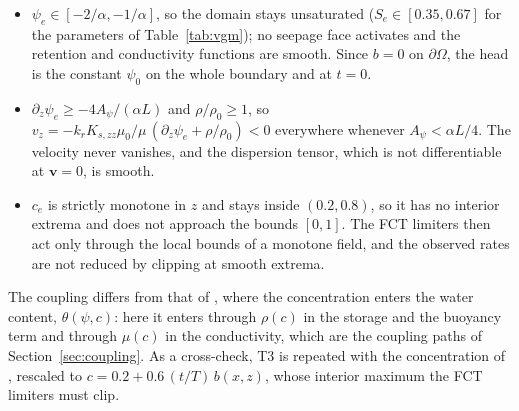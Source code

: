 \begin{itemize}
  \item $\psi_e\in[-2/\alpha,-1/\alpha]$, so the domain stays unsaturated
    ($S_e\in[0.35,0.67]$ for the parameters of Table~\ref{tab:vgm}); no
    seepage face activates and the retention and conductivity functions are
    smooth. Since $b=0$ on $\partial\Omega$, the head is the constant
    $\psi_0$ on the whole boundary and at $t=0$.
  \item $\partial_z\psi_e\ge-4A_\psi/(\alpha L)$ and $\rho/\rho_0\ge1$, so
    $v_z=-k_r K_{s,zz}\mu_0/\mu\,(\partial_z\psi_e+\rho/\rho_0)<0$ everywhere
    whenever $A_\psi<\alpha L/4$. The velocity never vanishes, and the
    dispersion tensor, which is not differentiable at $\mathbf{v}=0$, is
    smooth.
  \item $c_e$ is strictly monotone in $z$ and stays inside $(0.2,0.8)$, so it
    has no interior extrema and does not approach the bounds $[0,1]$. The FCT
    limiters then act only through the local bounds of a monotone field, and
    the observed rates are not reduced by clipping at smooth extrema.
\end{itemize}
The coupling differs from that of \cite{suciu2021}, where the concentration
enters the water content, $\theta(\psi,c)$: here it enters through
$\rho(c)$ in the storage and the buoyancy term and through $\mu(c)$ in the
conductivity, which are the coupling paths of Section~\ref{sec:coupling}. As a
cross-check, T3 is repeated with the concentration of \cite{suciu2021},
rescaled to $c=0.2+0.6\,(t/T)\,b(x,z)$, whose interior maximum the FCT
limiters must clip.


